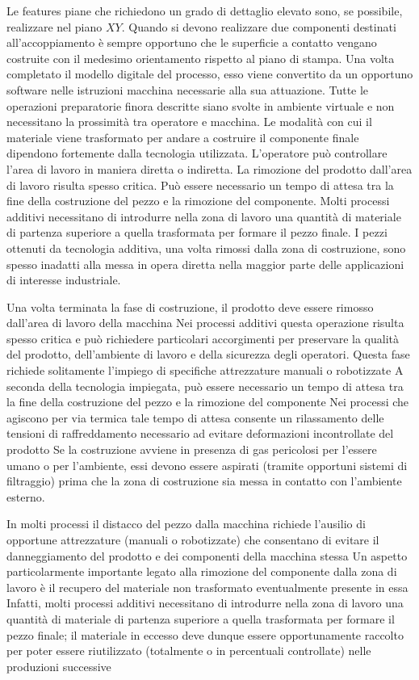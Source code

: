 Le features piane che richiedono un grado di dettaglio elevato sono, se possibile, realizzare nel piano $XY$.
Quando si devono realizzare due componenti destinati all'accoppiamento è sempre opportuno che le superficie a contatto vengano costruite con il medesimo orientamento rispetto al piano di stampa.
Una volta completato il modello digitale del processo, esso viene convertito da un opportuno software nelle istruzioni macchina necessarie alla sua attuazione.
Tutte le operazioni preparatorie finora descritte siano svolte in ambiente virtuale e non necessitano la prossimità tra operatore e macchina.
Le modalità con cui il materiale viene trasformato per andare  a costruire il componente finale dipendono fortemente dalla tecnologia utilizzata.
L'operatore può controllare l'area di lavoro in maniera diretta o indiretta.
La rimozione del prodotto dall'area di lavoro risulta spesso critica.
Può essere necessario un tempo di attesa tra la fine della costruzione del pezzo e la rimozione del componente.
Molti processi additivi necessitano di introdurre nella zona di lavoro una quantità di materiale di partenza superiore a quella trasformata per formare il pezzo finale.
I pezzi ottenuti da tecnologia additiva, una volta rimossi dalla zona di costruzione, sono spesso inadatti alla messa in opera diretta nella maggior parte delle applicazioni di interesse industriale.

Una volta terminata la fase di costruzione, il prodotto deve essere rimosso dall'area di lavoro
della macchina
Nei processi additivi questa operazione risulta spesso critica e può richiedere particolari
accorgimenti per preservare la qualità del prodotto, dell'ambiente di lavoro e della sicurezza
degli operatori. Questa fase richiede solitamente l'impiego di specifiche attrezzature manuali
o robotizzate
A seconda della tecnologia impiegata, può essere necessario un tempo di attesa tra la fine
della costruzione del pezzo e la rimozione del componente
Nei processi che agiscono per via termica tale tempo di attesa consente un rilassamento
delle tensioni di raffreddamento necessario ad evitare deformazioni incontrollate del
prodotto
Se la costruzione avviene in presenza di gas pericolosi per l'essere umano o per l'ambiente,
essi devono essere aspirati (tramite opportuni sistemi di filtraggio) prima che la zona di
costruzione sia messa in contatto con l'ambiente esterno.

In molti processi il distacco del pezzo dalla macchina richiede l'ausilio di opportune
attrezzature (manuali o robotizzate) che consentano di evitare il danneggiamento del
prodotto e dei componenti della macchina stessa
Un aspetto particolarmente importante legato alla rimozione del componente dalla zona di
lavoro è il recupero del materiale non trasformato eventualmente presente in essa
Infatti, molti processi additivi necessitano di introdurre nella zona di lavoro una quantità di
materiale di partenza superiore a quella trasformata per formare il pezzo finale; il materiale
in eccesso deve dunque essere opportunamente raccolto per poter essere riutilizzato
(totalmente o in percentuali controllate) nelle produzioni successive

